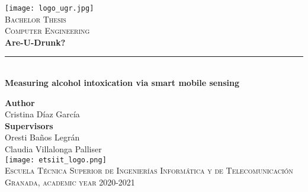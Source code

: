 \begin{titlepage}

 \newlength{\centeroffset}
 \setlength{\centeroffset}{-0.5\oddsidemargin}
 \addtolength{\centeroffset}{0.5\evensidemargin}
 \thispagestyle{empty}

 \noindent\hspace*{\centeroffset}
 \begin{minipage}{\textwidth}

  \centering
  \texttt{[image: logo\_ugr.jpg]}\\[1.4cm]

  \textsc{ \Large Bachelor Thesis\\[0.2cm]}
  \textsc{Computer Engineering}\\[1cm]

  {\Huge\bfseries Are-U-Drunk?\\}
  \noindent\rule[-1ex]{\textwidth}{3pt}\\[3.5ex]
  {\large\bfseries Measuring alcohol intoxication via smart mobile sensing}
 \end{minipage}

 \vspace{1cm}
 \noindent\hspace*{\centeroffset}
 \begin{minipage}{\textwidth}
  \centering

  \textbf{Author}\\ {Cristina Díaz García}\\[2.5ex]
  \textbf{Supervisors}\\
  {Oresti Baños Legrán}\\
  {Claudia Villalonga Palliser}\\[3ex]
  \texttt{[image: etsiit\_logo.png]}\\[0.1cm]
  \vspace{1cm}
  \textsc{Escuela Técnica Superior de Ingenierías Informática y de Telecomunicación}\\
  \vspace{1cm}
  \textsc{Granada, academic year 2020-2021}
 \end{minipage}
\end{titlepage}
